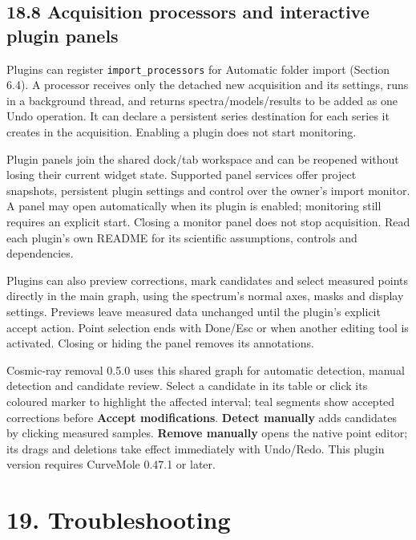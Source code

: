 \documentclass[
  10pt,
  a4paper,
  oneside]{scrreprt}
\begin{document}
\hypertarget{acquisition-processors-and-interactive-plugin-panels}{%
\section{18.8 Acquisition processors and interactive plugin
panels}\label{acquisition-processors-and-interactive-plugin-panels}}

Plugins can register \texttt{import\_processors} for Automatic folder
import (Section 6.4). A processor receives only the detached new
acquisition and its settings, runs in a background thread, and returns
spectra/models/results to be added as one Undo operation. It can declare
a persistent series destination for each series it creates in the
acquisition. Enabling a plugin does not start monitoring.

Plugin panels join the shared dock/tab workspace and can be reopened
without losing their current widget state. Supported panel services
offer project snapshots, persistent plugin settings and control over the
owner's import monitor. A panel may open automatically when its plugin
is enabled; monitoring still requires an explicit start. Closing a
monitor panel does not stop acquisition. Read each plugin's own README
for its scientific assumptions, controls and dependencies.

Plugins can also preview corrections, mark candidates and select
measured points directly in the main graph, using the spectrum's normal
axes, masks and display settings. Previews leave measured data unchanged
until the plugin's explicit accept action. Point selection ends with
Done/Esc or when another editing tool is activated. Closing or hiding
the panel removes its annotations.

Cosmic-ray removal 0.5.0 uses this shared graph for automatic detection,
manual detection and candidate review. Select a candidate in its table
or click its coloured marker to highlight the affected interval; teal
segments show accepted corrections before \textbf{Accept modifications}.
\textbf{Detect manually} adds candidates by clicking measured samples.
\textbf{Remove manually} opens the native point editor; its drags and
deletions take effect immediately with Undo/Redo. This plugin version
requires CurveMole 0.47.1 or later.

\hypertarget{troubleshooting}{%
\chapter{19. Troubleshooting}\label{troubleshooting}}
\end{document}
